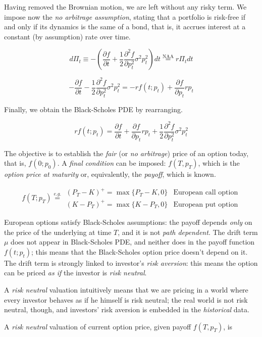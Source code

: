 \documentclass[oneside,titlepage,headinclude,12pt,a4paper,BCOR5mm,footinclude]{book}
\theoremstyle{defn}
\newcommand\de\partial
\begin{document}
Having removed  the Brownian motion,  we are left  without any risky  term. We
impose now the  \textit{no arbitrage assumption}, stating that  a portfolio is
risk-free if  and only  if its dynamics  is the  same of a  bond, that  is, it
accrues interest at a constant (by assumption) rate over time.

\[
  d\Pi_t \equiv - \left( \frac{\partial f}{\partial t} + 
    \frac{1}{2}\frac{\partial^2 f}{\partial p_t^2} \sigma^2 p_t^2 \right) dt 
    \stackrel{\text{NAA}}{=} r\Pi_t dt
\]

\[
  -\frac{\de f}{\de t} -\frac{1}{2}\frac{\de^2f}{\de p_t^2} \sigma^2 p_t^2 =
  -rf(t;p_t) + \frac{\de f}{\de p_t} rp_t
\]

Finally, we obtain the Black-Scholes PDE by rearranging.

\[
  rf(t;p_t) = \frac{\de f}{\de t} + \frac{\de f}{\de p_t} rp_t + \frac{1}{2}\frac{\de^2 f}{\de p_t^2} \sigma^2 p_t^2
\]

The objective  is to  establish the  \textit{fair} (or  \textit{no arbitrage})
price of an option today, that  is, $f(0;p_0)$. A \textit{final condition} can
be imposed:  $f(T,p_T)$, which  is the \textit{option  price at  maturity} or,
equivalently, the \textit{payoff}, which is known.

\[
  f(T;p_T) \stackrel{e.g.}{=}
  \begin{array}{ll}
    (P_T - K)^+ = \max \{ P_T - K, 0 \} & \text{European call option} \\
    (K - P_T)^+ = \max \{ K - P_T, 0 \} & \text{European put option}
  \end{array}
\]

European  options  satisfy  Black-Scholes   assumptions:  the  payoff  depends
\textit{only}  on the  price of  the underlying  at time  $T$, and  it is  not
\textit{path dependent}. The drift term $\mu$ does not appear in Black-Scholes
PDE, and neither  does in the payoff function $f(t;p_t)$;  this means that the
Black-Scholes option  price doesn't depend on  it. The drift term  is strongly
linked  to investor's  \textit{risk aversion}:  this means  the option  can be
priced \textit{as if} the investor is \textit{risk neutral}.

A \textit{risk neutral}  valuation intuitively means that we are  pricing in a
world where every investor behaves as if  he himself is risk neutral; the real
world is not risk neutral, though, and investors' risk aversion is embedded in
the \textit{historical} data.

A \textit{risk neutral} valuation of current option price, given payoff $f(T,p_T)$, is
\end{document}
